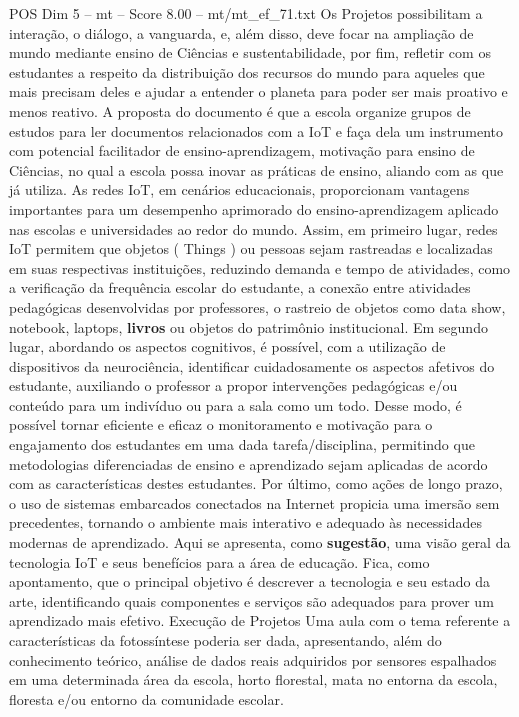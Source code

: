 \begin{textsample}{POS Dim 5 – mt – Score 8.00 – mt/mt\_ef\_71.txt}
Os Projetos possibilitam a interação, o diálogo, a vanguarda, e, além disso, deve focar na ampliação de mundo mediante ensino de Ciências e sustentabilidade, por fim, refletir com os estudantes a respeito da distribuição dos recursos do mundo para aqueles que mais precisam deles e ajudar a entender o planeta para poder ser mais proativo e menos reativo.
A proposta do documento é que a escola organize grupos de estudos para ler documentos relacionados com a IoT e faça dela um instrumento com potencial facilitador de ensino-aprendizagem, motivação para ensino de Ciências, no qual a escola possa inovar as práticas de ensino, aliando com as que já utiliza.
As redes IoT, em cenários educacionais, proporcionam vantagens importantes para um desempenho aprimorado do ensino-aprendizagem aplicado nas escolas e universidades ao redor do mundo.
Assim, em primeiro lugar, redes IoT permitem que objetos ( Things ) ou pessoas sejam rastreadas e localizadas em suas respectivas instituições, reduzindo demanda e tempo de atividades, como a verificação da frequência escolar do estudante, a conexão entre atividades pedagógicas desenvolvidas por professores, o rastreio de objetos como data show, notebook, laptops, \textbf{livros} ou objetos do patrimônio institucional.
Em segundo lugar, abordando os aspectos cognitivos, é possível, com a utilização de dispositivos da neurociência, identificar cuidadosamente os aspectos afetivos do estudante, auxiliando o professor a propor intervenções pedagógicas e/ou conteúdo para um indivíduo ou para a sala como um todo.
Desse modo, é possível tornar eficiente e eficaz o monitoramento e motivação para o engajamento dos estudantes em uma dada tarefa/disciplina, permitindo que metodologias diferenciadas de ensino e aprendizado sejam aplicadas de acordo com as características destes estudantes.
Por último, como ações de longo prazo, o uso de sistemas embarcados conectados na Internet propicia uma imersão sem precedentes, tornando o ambiente mais interativo e adequado às necessidades modernas de aprendizado.
Aqui se apresenta, como \textbf{sugestão}, uma visão geral da tecnologia IoT e seus benefícios para a área de educação.
Fica, como apontamento, que o principal objetivo é descrever a tecnologia e seu estado da arte, identificando quais componentes e serviços são adequados para prover um aprendizado mais efetivo.
Execução de Projetos Uma aula com o tema referente a características da fotossíntese poderia ser dada, apresentando, além do conhecimento teórico, análise de dados reais adquiridos por sensores espalhados em uma determinada área da escola, horto florestal, mata no entorna da escola, floresta e/ou entorno da comunidade escolar.

\end{textsample}
